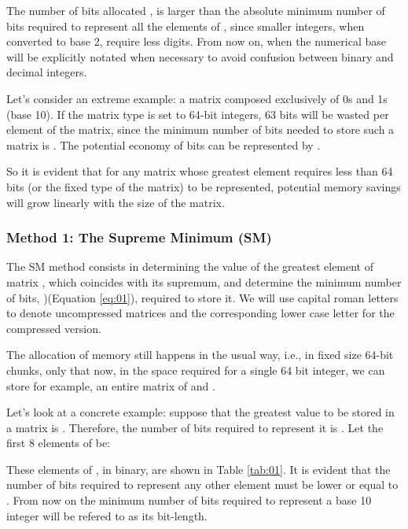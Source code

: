 \documentclass[10pt]{article}
\begin{document}
The number of bits allocated , is larger than the absolute minimum number of bits required to represent all the elements of , since smaller integers, when converted to base 2, require less digits. From now on, when the numerical base will be explicitly notated when necessary to avoid confusion between binary and decimal integers.  

Let's consider an extreme example: a matrix composed exclusively of 0s and 1s (base 10). If the matrix type is set to 64-bit integers, 63 bits will be wasted per element of the matrix, since the minimum number of bits needed to store such a matrix is . The potential economy of bits  can be represented by .


So it is evident that for any matrix whose greatest element requires less than 64 bits (or the fixed type of the matrix) to be represented, potential memory savings will grow linearly with the size of the matrix.

\subsubsection*{Method 1: The Supreme Minimum (SM)}

The SM method consists in determining the value of the greatest element of matrix , which coincides with its supremum,   and determine the minimum number of bits, )(Equation \ref{eq:01}), required to store it. We will use capital roman letters to denote uncompressed matrices and the corresponding lower case letter for the compressed version.



The allocation of memory still happens in the usual way, i.e., in fixed size 64-bit chunks, only that now, in the space required for a single 64 bit integer, we can store for example, an entire  matrix of  and . 

Let's look at a concrete example: suppose that the greatest value to be stored in a matrix  is . Therefore, the number of bits required to represent it is  . Let the first 8 elements of  be:



These elements of , in binary, are shown in Table \ref{tab:01}. It is evident that the number of bits required to represent any other element must be lower or equal to . From now on the minimum number of bits required to represent a base 10 integer will be refered to as its bit-length.
\end{document}
